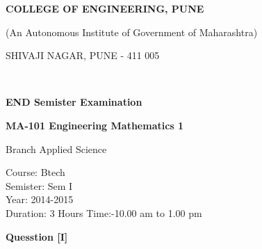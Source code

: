 \documentclass[12pt, a4paper]{exam}
\begin{document}
\begin{center} {
\large \textbf{COLLEGE OF ENGINEERING, PUNE} \par
\small (An Autonomous Institute of Government of Maharashtra) \par
\large SHIVAJI NAGAR, PUNE - 411 005 \par }
\end{center}
\hrulefill\\


\begin{center}

\large \textbf{END Semister Examination} \par
\textbf{MA-101 Engineering Mathematics 1 } \par

\end{center}
\begin{center}
\small {Branch Applied Science}
\end{center}


\begin{flushleft}

\small {
Course: Btech\\

Semister: Sem I\\

Year: 2014-2015\\

Duration: 3 Hours Time:-10.00 am to 1.00 pm}
\end{flushleft}




\textbf{Quesstion [I]}\\
\end{document}
